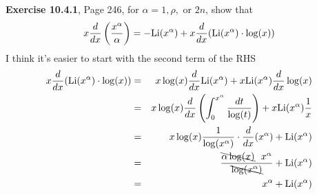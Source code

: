 \documentclass[aps,preprint,preprintnumbers,nofootinbib,showpacs,prd]{revtex4-1}
\newcommand{\nbea}{\begin{eqnarray*}}
\newcommand{\neea}{\end{eqnarray*}}
\begin{document}
{\bf Exercise 10.4.1}, Page 246, for $\alpha=1, \rho,$ or $2n$, show that
%
\nbea
x\frac{d}{dx}\left(\frac{x^\alpha}{\alpha}\right) = -{\rm Li}(x^\alpha) +x\frac{d}{dx} ({\rm Li}(x^\alpha)\cdot\log(x))
\neea
%
I think it's easier to start with the second term of the RHS
%
\nbea
x\frac{d}{dx} ({\rm Li}(x^\alpha)\cdot\log(x)) & = & x \log(x) \frac{d}{dx} {\rm Li}(x^\alpha) + x{\rm Li}(x^\alpha)\frac{d}{dx} \log(x) \\
& = & x\log(x)\frac{d}{dx}\left(\int_0^{x^\alpha}\frac{dt}{\log(t)}\right) + x{\rm Li}(x^\alpha)\frac{1}{x} \\
& = & x\log(x) \frac{1}{\log(x^\alpha)}\cdot\frac{d}{dx}(x^\alpha) + {\rm Li}(x^\alpha) \\
& = & \frac{\bcancel{\alpha \log(x)}~~ x^\alpha}{\bcancel{\log(x^\alpha)}} + {\rm Li}(x^\alpha) \\
& = & x^\alpha + {\rm Li}(x^\alpha)
\neea
%
\end{document}
